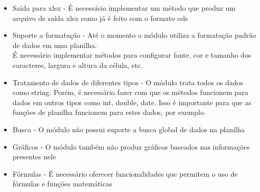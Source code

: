 {\begin{itemize}
\item Saída para xlsx - É necessário implementar um método que produz um arquivo de saída xlsx como já é feito com o formato ods
\item Suporte a formatação - Até o momento o módulo utiliza a formatação padrão de dados em uma planilha.\\ É necessário implementar métodos para configurar fonte, cor e tamanho dos caracteres, largura e altura da célula, etc.
\item Tratamento de dados de diferentes tipos - O módulo trata todos os dados como string. Porém, é necessário fazer com que os métodos funcionem para dados em outros tipos como int, double, date. Isso é importante para que as funções de planilha funcionem para estes dados, por exemplo.
\item Busca - O módulo não possui suporte a busca global de dados na planilha
\item Gráficos - O módulo também não produz gráficos baseados nas informações presentes nele
\item Fórmulas - É necessário oferecer funcionalidades que permitem o uso de fórmulas e funções matemáticas
\end{itemize}

}